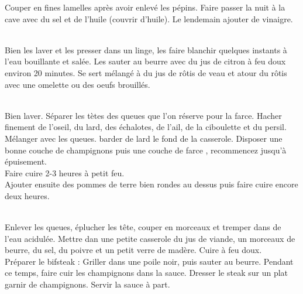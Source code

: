 \begin{minipage}[c]{\textwidth}
Couper en fines lamelles après avoir enlevé les pépins. Faire passer la nuit à la cave avec du sel et de l'huile (couvrir d'huile). Le lendemain ajouter de vinaigre.\\
\\

\end{minipage}

\begin{minipage}[c]{\textwidth}
Bien les laver et les presser dans un linge, les faire blanchir quelques instants à l'eau bouillante et salée. Les sauter au beurre avec du jus de citron à feu doux environ 20 minutes. Se sert mélangé à du jus de rôtis de veau et atour du rôtis avec une omelette ou des oeufs brouillés.\\
\\

\end{minipage}

\begin{minipage}[c]{\textwidth}
Bien laver. Séparer les tètes des queues que l'on réserve pour la farce. Hacher finement de l'oseil, du lard, des échalotes, de l'ail, de la ciboulette et du persil. Mélanger avec les queues. barder de lard le fond de la casserole. Disposer une bonne couche de champignons puis une couche de farce , recommencez jusqu'à épuisement.\\
Faire cuire 2-3 heures à petit feu.\\
Ajouter ensuite des pommes de terre bien rondes au dessus puis faire cuire encore deux heures.\\
\\

\end{minipage}

\begin{minipage}[c]{\textwidth}
Enlever les queues, éplucher les tête, couper en morceaux et tremper dans de l'eau acidulée. Mettre dan une petite casserole du jus de viande, un morceaux de beurre, du sel, du poivre et un petit verre de madère. Cuire à feu doux. \\
Préparer le bifsteak : Griller dans une poile noir, puis sauter au beurre. Pendant ce temps, faire cuir les champignons dans la sauce. Dresser le steak sur un plat garnir de champignons. Servir la sauce à part.\\
\\

\end{minipage}

